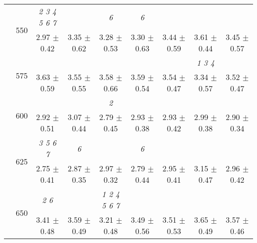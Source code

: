\begin{table}[h]
{\begin{tabular}{
        ccccccccc}
 & \multirow{2}{*}{550}& \textit{ 2 3 4 5 6 7 }& & \textit{ 6 }& \textit{ 6 }& & &  \\ 
 & & 2.97 $\pm$ 0.42& 3.35 $\pm$ 0.62& 3.28 $\pm$ 0.53& 3.30 $\pm$ 0.63& 3.44 $\pm$ 0.59& 3.61 $\pm$ 0.44& 3.45 $\pm$ 0.57 \\ 
 & \multirow{2}{*}{575}& \cellcolor[HTML]{EFEFEF} & \cellcolor[HTML]{EFEFEF} & \cellcolor[HTML]{EFEFEF} & \cellcolor[HTML]{EFEFEF} & \cellcolor[HTML]{EFEFEF} & \cellcolor[HTML]{EFEFEF} \textit{ 1 3 4 }& \cellcolor[HTML]{EFEFEF}  \\ 
 & & \cellcolor[HTML]{EFEFEF} 3.63 $\pm$ 0.59& \cellcolor[HTML]{EFEFEF} 3.55 $\pm$ 0.55& \cellcolor[HTML]{EFEFEF} 3.58 $\pm$ 0.66& \cellcolor[HTML]{EFEFEF} 3.59 $\pm$ 0.54& \cellcolor[HTML]{EFEFEF} 3.54 $\pm$ 0.47& \cellcolor[HTML]{EFEFEF} 3.34 $\pm$ 0.57& \cellcolor[HTML]{EFEFEF} 3.52 $\pm$ 0.47 \\ 
 & \multirow{2}{*}{600}& & & \textit{ 2 }& & & &  \\ 
 & & 2.92 $\pm$ 0.51& 3.07 $\pm$ 0.44& 2.79 $\pm$ 0.45& 2.93 $\pm$ 0.38& 2.93 $\pm$ 0.42& 2.99 $\pm$ 0.38& 2.90 $\pm$ 0.34 \\ 
 & \multirow{2}{*}{625}& \cellcolor[HTML]{EFEFEF} \textit{ 3 5 6 7 }& \cellcolor[HTML]{EFEFEF} \textit{ 6 }& \cellcolor[HTML]{EFEFEF} & \cellcolor[HTML]{EFEFEF} \textit{ 6 }& \cellcolor[HTML]{EFEFEF} & \cellcolor[HTML]{EFEFEF} & \cellcolor[HTML]{EFEFEF}  \\ 
 & & \cellcolor[HTML]{EFEFEF} 2.75 $\pm$ 0.41& \cellcolor[HTML]{EFEFEF} 2.87 $\pm$ 0.35& \cellcolor[HTML]{EFEFEF} 2.97 $\pm$ 0.32& \cellcolor[HTML]{EFEFEF} 2.79 $\pm$ 0.44& \cellcolor[HTML]{EFEFEF} 2.95 $\pm$ 0.41& \cellcolor[HTML]{EFEFEF} 3.15 $\pm$ 0.47& \cellcolor[HTML]{EFEFEF} 2.96 $\pm$ 0.42 \\ 
 & \multirow{2}{*}{650}& \textit{ 2 6 }& & \textit{ 1 2 4 5 6 7 }& & & &  \\ 
 & & 3.41 $\pm$ 0.48& 3.59 $\pm$ 0.49& 3.21 $\pm$ 0.48& 3.49 $\pm$ 0.56& 3.51 $\pm$ 0.53& 3.65 $\pm$ 0.49& 3.57 $\pm$ 0.46 \\ \midrule 

        \bottomrule
        \end{tabular}%
        }

        \end{table}
        
